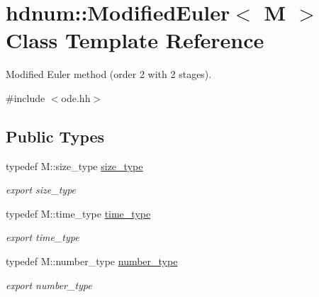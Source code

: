 \hypertarget{classhdnum_1_1ModifiedEuler}{
\section{hdnum::ModifiedEuler$<$ M $>$ Class Template Reference}
\label{classhdnum_1_1ModifiedEuler}
}


Modified Euler method (order 2 with 2 stages).  




{\ttfamily \#include $<$ode.hh$>$}

\subsection*{Public Types}
\begin{DoxyCompactItemize}
\item 
\hypertarget{classhdnum_1_1ModifiedEuler_aa8841e11397920c273afab1f9a04c9bd}{
typedef M::size\_\-type \hyperlink{classhdnum_1_1ModifiedEuler_aa8841e11397920c273afab1f9a04c9bd}{size\_\-type}}
\label{classhdnum_1_1ModifiedEuler_aa8841e11397920c273afab1f9a04c9bd}

\begin{DoxyCompactList}\small\item\em export size\_\-type \item\end{DoxyCompactList}\item 
\hypertarget{classhdnum_1_1ModifiedEuler_a1c273cddcddf36f6e47f713080c06b41}{
typedef M::time\_\-type \hyperlink{classhdnum_1_1ModifiedEuler_a1c273cddcddf36f6e47f713080c06b41}{time\_\-type}}
\label{classhdnum_1_1ModifiedEuler_a1c273cddcddf36f6e47f713080c06b41}

\begin{DoxyCompactList}\small\item\em export time\_\-type \item\end{DoxyCompactList}\item 
\hypertarget{classhdnum_1_1ModifiedEuler_abcfd3cb8a5b446f721582af3b170476e}{
typedef M::number\_\-type \hyperlink{classhdnum_1_1ModifiedEuler_abcfd3cb8a5b446f721582af3b170476e}{number\_\-type}}
\label{classhdnum_1_1ModifiedEuler_abcfd3cb8a5b446f721582af3b170476e}

\begin{DoxyCompactList}\small\item\em export number\_\-type \item\end{DoxyCompactList}\end{DoxyCompactItemize}
